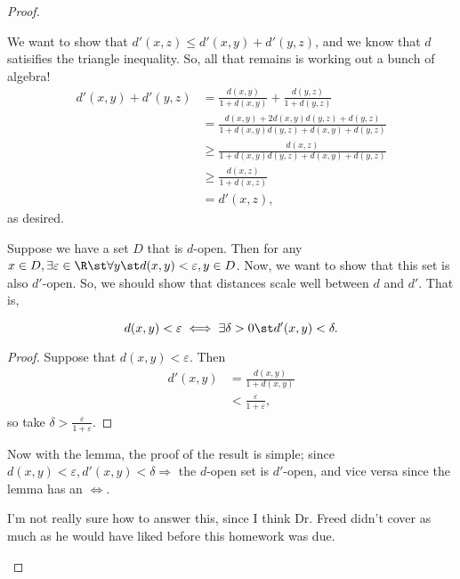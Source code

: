 \documentclass{assignment}
\begin{document}
\begin{proof}
\begin{qparts}
      We want to show that $d'(x,z) \leq d'(x,y) + d'(y,z)$, and we know that $d$ satisifies the triangle
      inequality. So, all that remains is working out a bunch of algebra!
      \begin{align*}
        d'(x,y) + d'(y,z) &= \frac{d(x,y)}{1 + d(x,y)} + \frac{d(y,z)}{1 + d(y,z)} \\
                          &= \frac{d(x,y) + 2d(x,y)d(y,z) + d(y,z)}{1 + d(x,y)d(y,z) + d(x,y) + d(y,z)} \\
                          &\geq \frac{d(x,z)}{1 + d(x,y)d(y,z) + d(x,y) + d(y,z)} \\
                          &\geq \frac{d(x,z)}{1 + d(x,z)} \\
                          &= d'(x,z),
      \end{align*}
      as desired.
    \item Suppose we have a set $D$ that is $d$-open. Then for any $x\in D, \exists\varepsilon\in\R\st 
      \forall y \st d(x,y) < \varepsilon, y\in D$. Now, we want to show that this set is also $d'$-open. 
      So, we should show that distances scale well between $d$ and $d'$. That is, 
      \begin{lemma}
        $$d(x,y) < \varepsilon \iff \exists\delta > 0 \st d'(x,y) < \delta.$$
      \end{lemma}
      \begin{proof}
        Suppose that $d(x,y) < \varepsilon$. Then 
        \begin{align*}  
          d'(x,y) &= \frac{d(x,y)}{1 + d(x,y)} \\
                  &< \frac{\varepsilon}{1 + \varepsilon},
        \end{align*}
        so take $\delta > \frac{\varepsilon}{1 + \varepsilon}$.
      \end{proof}
      Now with the lemma, the proof of the result is simple; since $d(x,y) < \varepsilon, d'(x,y) < 
      \delta \Rightarrow $ the $d$-open set is $d'$-open, and vice versa since the lemma has an $\iff.$

    \item I'm not really sure how to answer this, since I think Dr. Freed didn't cover as much as he 
      would have liked before this homework was due.
  \end{qparts}
\end{proof}
\end{document}
